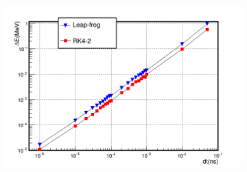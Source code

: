\documentclass[a4paper,oneside,12pt]{report}
\numberwithin{equation}{chapter}
\begin{document}
{\iffalse \begin{figure}[H]
    \centering
    \begin{subfigure}{0.9\textwidth}
        \centering
        \includegraphics[width=\linewidth]{./figures/analiz/90staticE_lf_rk2_dt-E_3.png}
    \end{subfigure}
    

\end{figure}}
\end{document}

